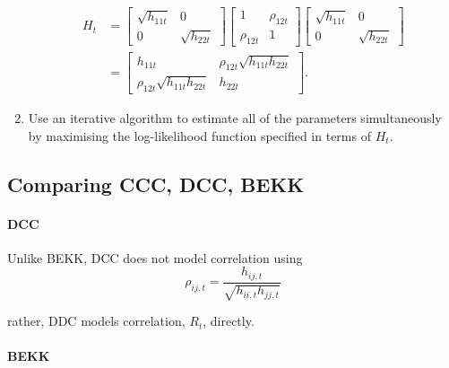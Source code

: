 \documentclass[11pt]{article}
\begin{document}
\begin{procedure}
\begin{enumerate}
        \begin{equation}
            \begin{aligned}
            H_t & =\left[\begin{array}{cc}
            \sqrt{h_{11 t}} & 0 \\
            0 & \sqrt{h_{22 t}}
            \end{array}\right]\left[\begin{array}{cc}
            1 & \rho_{12 t} \\
            \rho_{12 t} & 1
            \end{array}\right]\left[\begin{array}{cc}
            \sqrt{h_{11 t}} & 0 \\
            0 & \sqrt{h_{22 t}}
            \end{array}\right] \\
            & =\left[\begin{array}{cc}
            h_{11 t} & \rho_{12 t} \sqrt{h_{11 t} h_{22 t}} \\
            \rho_{12 t} \sqrt{h_{11 t} h_{22 t}} & h_{22 t}
            \end{array}\right] .
            \end{aligned}
        \end{equation}
        \item Use an iterative algorithm to estimate all of the parameters simultaneously by maximising the log-likelihood function specified in terms of $H_t$.
    \end{enumerate}
\end{procedure}

\subsection{Comparing CCC, DCC, BEKK}

\paragraph{DCC} \mbox{}

Unlike BEKK, DCC does not model correlation using
\[\rho_{ij,t} = \dfrac{h_{ij,t}}{\sqrt{h_{ii,t} h_{jj,t}}}\]

rather, DDC models correlation, $R_t$, directly.

\paragraph{BEKK} \mbox{}
\end{document}
